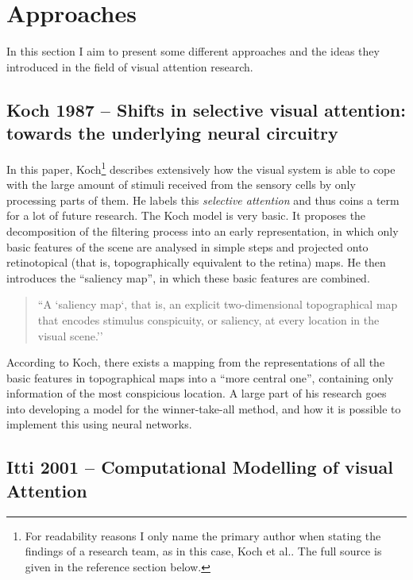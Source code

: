 \documentclass[a4paper,12pt,fleqn,oneside]{scrartcl}
\begin{document}
\section{Approaches}

In this section I aim to present some different approaches and the ideas they
introduced in the field of visual attention research. 

\subsection{Koch 1987 -- Shifts in selective visual attention: towards the underlying neural circuitry}

In this paper, Koch\footnote{For readability reasons I only name the primary author when stating the findings of a
research team, as in this case, Koch et al.\cite{koch1987}. The full source is given in the reference section below.}
describes extensively how the visual system is able to cope with the large amount of stimuli received from the sensory
cells by only processing parts of them. He labels this \emph{selective attention} and thus coins a term for a lot of
future research. The Koch model is very basic. It proposes the decomposition of the filtering process into an early
representation, in which only basic features of the scene are analysed in simple steps and projected onto retinotopical
(that is,  topographically equivalent to the retina) maps. He then introduces the ``saliency map'', in which these basic
features are combined.

    \begin{quote}
    ``A `saliency map`, that is, an explicit two-dimensional topographical map that
    encodes stimulus conspicuity, or saliency, at every location in the visual
    scene.''\cite{itti2001}
    \end{quote}

According to Koch, there exists a mapping from the representations of all the basic  features in topographical maps into
a ``more central one'', containing only information of the most conspicious location.  A large part of his research goes
into developing a model for the winner-take-all method, and how it is possible to implement this using neural networks.

\subsection{Itti 2001 -- Computational Modelling of visual Attention}
\end{document}
